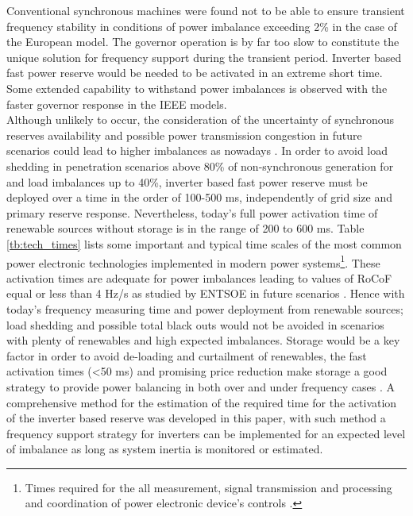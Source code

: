 Conventional synchronous machines were found not to be able to ensure transient frequency stability in conditions of power imbalance exceeding 2\% in the case of the European model. The governor operation is by far too slow to constitute the unique solution for frequency support during the transient period. Inverter based fast power reserve would be needed to be activated in an extreme short time. Some extended capability to withstand power imbalances is observed with the faster governor response in the IEEE models. \\

Although unlikely to occur, the consideration of the uncertainty of synchronous reserves availability and possible power transmission congestion in future scenarios could lead to higher imbalances as nowadays \cite{dena2014}. In order to avoid load shedding in penetration scenarios above 80\% of non-synchronous generation for and load imbalances up to 40\%, inverter based fast power reserve must be deployed over a time in the order of 100-500 ms, independently of grid size and primary reserve response. Nevertheless, today’s full power activation time of renewable sources without storage is in the range of 200 to 600 ms. Table \ref{tb:tech_times} lists some important and typical time scales of the most common power electronic technologies implemented in modern power systems\footnote{Times required for the all measurement, signal transmission and processing and coordination of power electronic device's controls \cite{miller2017technology}.}. These activation times are adequate for power imbalances leading to values of RoCoF equal or less than 4 Hz/s as studied by ENTSOE in future scenarios \cite{ENTSOE.2016}. Hence with today’s frequency measuring time and power deployment from renewable sources; load shedding and possible total black outs would not be avoided in scenarios with plenty of renewables and high expected imbalances. Storage would be a key factor in order to avoid de-loading and curtailment of renewables, the fast activation times (<50 ms) and promising price reduction make storage a good strategy to provide power balancing in both over and under frequency cases \cite{irena2017electricity}. A comprehensive method for the estimation of the required time for the activation of the inverter based reserve was developed in this paper, with such method a frequency support strategy for inverters can be implemented for an expected level of imbalance as long as system inertia is monitored or estimated.\\

